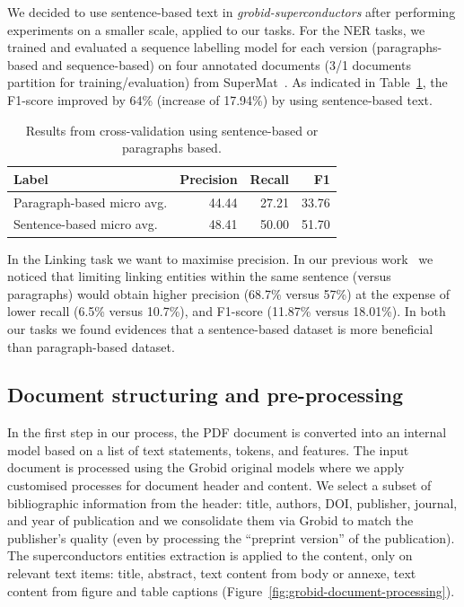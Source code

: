 \documentclass{article}
\begin{document}
We decided to use sentence-based text in \textit{grobid-superconductors} after performing experiments on a smaller scale, applied to our tasks. 
For the NER tasks, we trained and evaluated a sequence labelling model for each version (paragraphs-based and sequence-based) on four annotated documents (3/1 documents partition for training/evaluation) from SuperMat~\cite{foppiano2021supermat}.
As indicated in Table~\ref{tab:comparison-evaluation-sentences-paragraphs}, the F1-score improved by 64\% (increase of 17.94\%) by using sentence-based text.

\begin{table}[ht]
\centering\small
\begin{tabular}{lrrr}
\toprule
\textbf{Label} & \textbf{Precision} & \textbf{Recall} & \textbf{F1} \\
\midrule
Paragraph-based micro avg. & 44.44 & 27.21 & 33.76   \\
Sentence-based micro avg. & 48.41 & 50.00 & 51.70  \\
\bottomrule
\end{tabular}
\caption{\label{tab:comparison-evaluation-sentences-paragraphs} Results from cross-validation using sentence-based or paragraphs based.  }
\end{table}

In the Linking task we want to maximise precision. 
In our previous work~\cite{foppiano2019proposal} we noticed that limiting linking entities within the same sentence (versus paragraphs) would obtain higher precision (68.7\% versus 57\%) at the expense of lower recall (6.5\% versus 10.7\%), and F1-score (11.87\% versus 18.01\%). 
In both our tasks we found evidences that a sentence-based dataset is more beneficial than paragraph-based dataset. 


\subsection{Document structuring and pre-processing}
\label{subsubsec:document-structuring}
In the first step in our process, the PDF document is converted into an internal model based on a list of text statements, tokens, and features. 
The input document is processed using the Grobid original models where we apply customised processes for document header and content. 
We select a subset of bibliographic information from the header: title, authors, DOI, publisher, journal, and year of publication and we consolidate them via Grobid to match the publisher's quality (even by processing the ``preprint version'' of the publication). 
The superconductors entities extraction is applied to the content, only on relevant text items: title, abstract, text content from body or annexe, text content from figure and table captions (Figure~\ref{fig:grobid-document-processing}).
\end{document}
